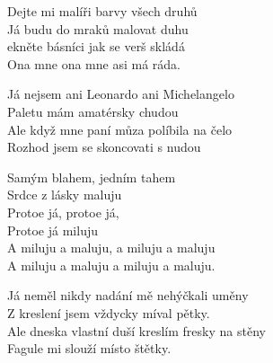 
\re{*}
Dejte mi malíři barvy všech druhů\\
Já budu do mraků malovat duhu\\
ekněte básníci jak se verš skládá\\
Ona mne ona mne asi má ráda.

\ve
{}Já nejsem ani Leonardo ani Michelangelo\\
Paletu mám amatérsky chudou\\
Ale když mne paní můza políbila na čelo\\
Rozhod jsem se skoncovati s nudou

\cho{}
Samým blahem, jedním tahem\\
Srdce z lásky maluju\\
Protoe já, protoe já,\\
Protoe já miluju\\
A miluju a maluju, a miluju a maluju\\
A miluju a maluju a miluju a maluju.

\ve
Já neměl nikdy nadání mě nehýčkali uměny\\
Z kreslení jsem vždycky míval pětky.\\
Ale dneska vlastní duší kreslím fresky na stěny\\
Fagule mi slouží místo štětky.

\cho{}

\esong{}

